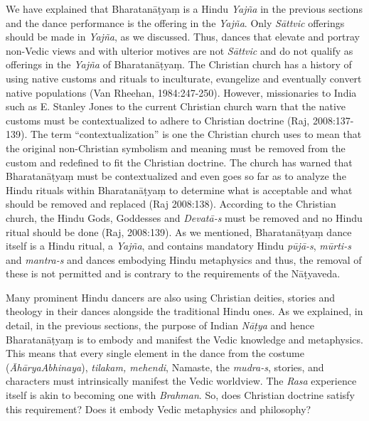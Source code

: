 We have explained that Bharatanāṭyaṃ is a Hindu \textit{Yajña} in the previous sections and the dance performance is the offering in the \textit{Yajña}. Only \textit{Sāttvic} offerings should be made in \textit{Yajña}, as we discussed. Thus, dances that elevate and portray non-Vedic views and with ulterior motives are not \textit{Sāttvic} and do not qualify as offerings in the \textit{Yajña} of Bharatanāṭyaṃ. The Christian church has a history of using native customs and rituals to inculturate, evangelize and eventually convert native populations (Van Rheehan, 1984:247-250). However, missionaries to India such as E. Stanley Jones to the current Christian church warn that the native customs must be contextualized to adhere to Christian doctrine (Raj, 2008:137-139). The term “contextualization” is one the Christian church uses to mean that the original non-Christian symbolism and meaning must be removed from the custom and redefined to fit the Christian doctrine. The church has warned that Bharatanāṭyaṃ must be contextualized and even goes so far as to analyze the Hindu rituals within Bharatanāṭyaṃ to determine what is acceptable and what should be removed and replaced (Raj 2008:138). According to the Christian church, the Hindu Gods, Goddesses and \textit{Devatā-s} must be removed and no Hindu ritual should be done (Raj, 2008:139). As we mentioned, Bharatanāṭyaṃ dance itself is a Hindu ritual, a \textit{Yajña}, and contains mandatory Hindu \textit{pūjā-s}, \textit{mūrti-s} and \textit{mantra-s} and dances embodying Hindu metaphysics and thus, the removal of these is not permitted and is contrary to the requirements of the Nāṭyaveda.

\vskip 2pt

Many prominent Hindu dancers are also using Christian deities, stories and theology in their dances alongside the traditional Hindu ones. As we explained, in detail, in the previous sections, the purpose of Indian \textit{Nāṭya }and hence Bharatanāṭyaṃ is to embody and manifest the Vedic knowledge and metaphysics. This means that every single element in the dance from the costume (\textit{ĀhāryaAbhinaya}), \textit{tilakam, mehendi}, Namaste, the \textit{mudra-s}, stories, and characters must intrinsically manifest the Vedic worldview. The \textit{Rasa} experience itself is akin to becoming one with \textit{Brahman}. So, does Christian doctrine satisfy this requirement? Does it embody Vedic metaphysics and philosophy?

\vskip 2pt

